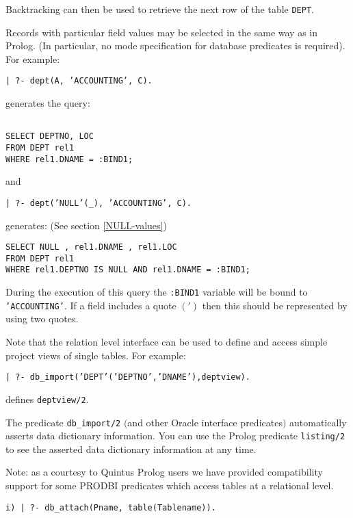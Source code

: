 Backtracking can then be used to retrieve the next row of the table {\tt DEPT}.

Records with particular field values may be selected in the same way
as in Prolog.  (In particular, no mode specification for database predicates is
required). For example:
\begin{center}

{\tt | ?- dept(A, 'ACCOUNTING', C).}
\end{center}
generates the query:
\begin{verbatim}

SELECT DEPTNO, LOC
FROM DEPT rel1
WHERE rel1.DNAME = :BIND1;
\end{verbatim}
and 
\begin{center}

{\tt | ?- dept('NULL'(\_), 'ACCOUNTING', C).}
\end{center}
generates: (See section \ref{NULL-values})
\begin{verbatim}
SELECT NULL , rel1.DNAME , rel1.LOC
FROM DEPT rel1
WHERE rel1.DEPTNO IS NULL AND rel1.DNAME = :BIND1;
\end{verbatim}
During the execution of this query the {\tt :BIND1} variable will be bound
to {\tt 'ACCOUNTING'}.\newline
If a field includes a quote $(')$ then this should be represented by
using two quotes.

Note that the relation level interface can be used to define and
access simple project views of single tables.  For example:
\begin{center}

{\tt | ?- db\_import('DEPT'('DEPTNO','DNAME'),deptview).}
\end{center}
defines {\tt deptview/2}.

The predicate {\tt db\_import/2} $($and other Oracle interface
predicates$)$ automatically asserts data dictionary information.  You
can use the Prolog predicate {\tt listing/2} to see the asserted data
dictionary information at any time.  


Note: as a courtesy to Quintus Prolog users we have provided
compatibility support for some PRODBI predicates which access tables
at a relational level.

\begin{verbatim}
i) | ?- db_attach(Pname, table(Tablename)).
\end{verbatim}

